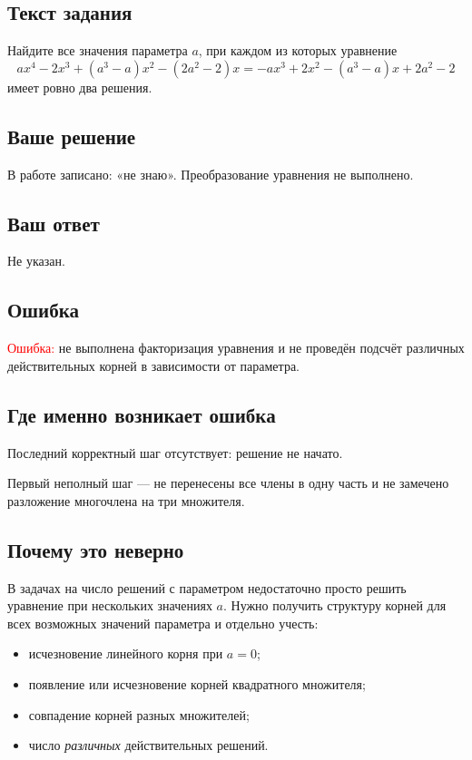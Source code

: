 \documentclass[12pt,a4paper]{article}
\begin{document}
\subsection*{Текст задания}
Найдите все значения параметра $a$, при каждом из которых уравнение
\[
ax^4-2x^3+(a^3-a)x^2-(2a^2-2)x
=
-ax^3+2x^2-(a^3-a)x+2a^2-2
\]
имеет ровно два решения.

\subsection*{Ваше решение}
В работе записано: «не знаю». Преобразование уравнения не выполнено.

\subsection*{Ваш ответ}
Не указан.

\subsection*{Ошибка}
\textcolor{red}{Ошибка:} не выполнена факторизация уравнения и не проведён подсчёт различных действительных корней в зависимости от параметра.

\subsection*{Где именно возникает ошибка}
Последний корректный шаг отсутствует: решение не начато.

Первый неполный шаг --- не перенесены все члены в одну часть и не замечено разложение многочлена на три множителя.

\subsection*{Почему это неверно}
В задачах на число решений с параметром недостаточно просто решить уравнение при нескольких значениях $a$. Нужно получить структуру корней для всех возможных значений параметра и отдельно учесть:
\begin{itemize}
  \item исчезновение линейного корня при $a=0$;
  \item появление или исчезновение корней квадратного множителя;
  \item совпадение корней разных множителей;
  \item число \emph{различных} действительных решений.
\end{itemize}
\end{document}
